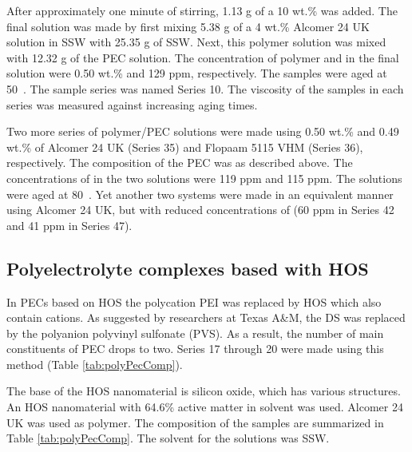 \documentclass[energies,article,submit,moreauthors,pdftex]{Definitions/mdpi}
\begin{document}

 
After approximately one minute of stirring, 1.13 g of a 10 wt.\%  was added. The final solution was made by first mixing 5.38 g of a 4 wt.\% Alcomer 24 UK solution in SSW with 25.35 g of SSW. Next, this polymer solution was mixed with 12.32 g of the PEC solution. The concentration of polymer and  in the final solution were 0.50 wt.\% and 129 ppm, respectively. The samples were aged at 50~\celsius. The sample series was named Series 10. The viscosity of the samples in each series was measured against increasing aging times. 

Two more series of polymer/PEC solutions were made using 0.50 wt.\% and 0.49 wt.\% of Alcomer 24 UK (Series 35) and Flopaam 5115 VHM (Series 36), respectively. The composition of the PEC was as described above. The concentrations of  in the two solutions were 119 ppm and 115 ppm. The solutions were aged at 80~\celsius. Yet another two systems were made in an equivalent manner using Alcomer 24 UK, but with reduced concentrations of  (60 ppm in Series 42 and 41 ppm in Series 47).

\subsection{Polyelectrolyte complexes based with HOS}
In PECs based on HOS the polycation PEI was replaced by HOS which also contain cations. As suggested by researchers at Texas A\&M, the DS was replaced by the polyanion polyvinyl sulfonate (PVS). As a result, the number of main constituents of PEC drops to two. Series 17 through 20 were made using this method (Table \ref{tab:polyPecComp}). 


The base of the HOS nanomaterial is silicon oxide, which has various structures. An HOS nanomaterial with 64.6\% active matter in solvent was used. Alcomer 24 UK was used as polymer. The composition of the samples are summarized in Table \ref{tab:polyPecComp}. The solvent for the solutions was SSW.
\end{document}
